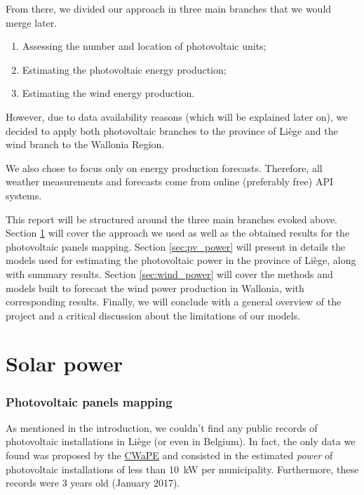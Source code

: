 \documentclass[a4paper, 12pt]{article}
\begin{document}
From there, we divided our approach in three main branches that we would merge later.
\begin{enumerate}
    \item Assessing the number and location of photovoltaic units;
    \item Estimating the photovoltaic energy production;
    \item Estimating the wind energy production.
\end{enumerate}

However, due to data availability reasons (which will be explained later on), we decided to apply both photovoltaic branches to the province of Liège and the wind branch to the Wallonia Region.

We also chose to focus only on energy production forecasts. Therefore, all weather measurements and forecasts come from online (preferably free) API systems.

This report will be structured around the three main branches evoked above. Section \ref{sec:pv_mapping} will cover the approach we used as well as the obtained results for the photovoltaic panels mapping. Section \ref{sec:pv_power} will present in details the models used for estimating the photovoltaic power in the province of Liège, along with summary results. Section \ref{sec:wind_power} will cover the methods and models built to forecast the wind power production in Wallonia, with corresponding results. Finally, we will conclude with a general overview of the project and a critical discussion about the limitations of our models.

\newpage

\part{Solar power}

\section{Photovoltaic panels mapping}\label{sec:pv_mapping}

As mentioned in the introduction, we couldn't find any public records of photovoltaic installations in Liège (or even in Belgium). In fact, the only data we found was proposed by the \href{https://www.cwape.be/}{CWaPE} and consisted in the estimated \emph{power} of photovoltaic installations of less than \SI{10}{\kilo\watt} per municipality. Furthermore, these records were 3 years old (January 2017).
\end{document}
